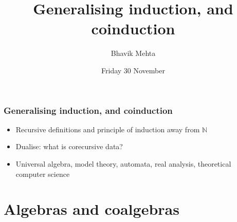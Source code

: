 \documentclass{beamer}
\title{Generalising induction, and coinduction}
\author{Bhavik Mehta}
\institute{Part III Seminar}
\date{Friday 30 November}
\begin{document}
\begin{frame}
  \titlepage
\end{frame}
\begin{frame}
  \frametitle{Generalising induction, and coinduction}
  \begin{itemize}
    \item<2-> Recursive definitions and principle of induction away from $\mathbb{N}$
    \item<3-> Dualise: what is corecursive data?
      \vspace{\baselineskip}
    \item<4-> Universal algebra, model theory, automata, real analysis, theoretical computer science
  \end{itemize}
\end{frame}
\section{Algebras and coalgebras}
\end{document}
